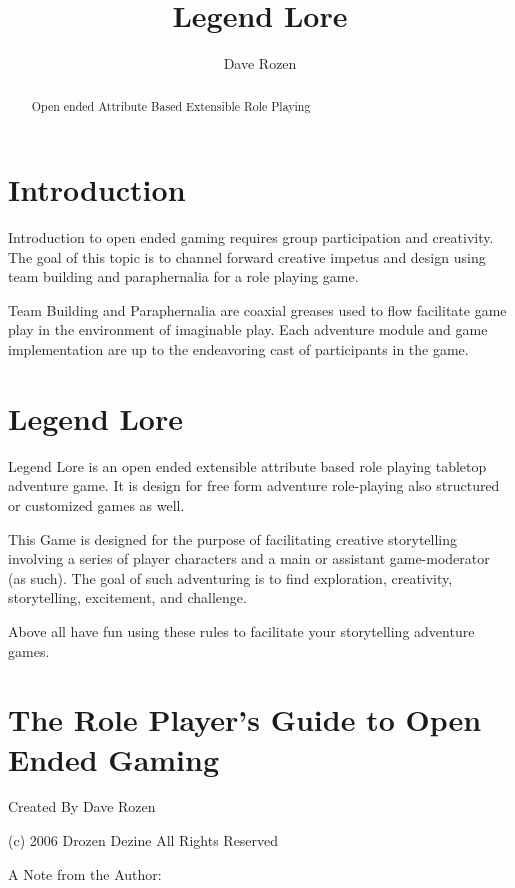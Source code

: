 \documentclass{article}
\begin{document}



\title{Legend Lore}
\author{Dave Rozen}

\begin{abstract}
Open ended Attribute Based Extensible Role Playing
\end{abstract}

\section{Introduction}

Introduction to open ended gaming requires group participation and creativity. The goal of this topic is to  channel forward creative impetus and design using team building and paraphernalia for a  role playing game.

Team Building and Paraphernalia are coaxial greases used to flow facilitate game play in the environment of imaginable play. Each adventure module and game implementation are up to the endeavoring cast of participants in the game.

\section{Legend Lore}

Legend Lore is an open ended extensible attribute based role playing tabletop adventure game. It is design for free form adventure role-playing also structured or customized games as well.

This Game is designed for the purpose of facilitating creative storytelling involving a series of player characters and a main or assistant game-moderator (as such). The goal of such adventuring is to find exploration, creativity, storytelling, excitement, and challenge.

Above all have fun using these rules to facilitate your storytelling adventure games.

\section{The Role Player's Guide to Open Ended Gaming}

Created By Dave Rozen

(c) 2006 Drozen Dezine All Rights Reserved

A Note from the Author:
\end{document}

